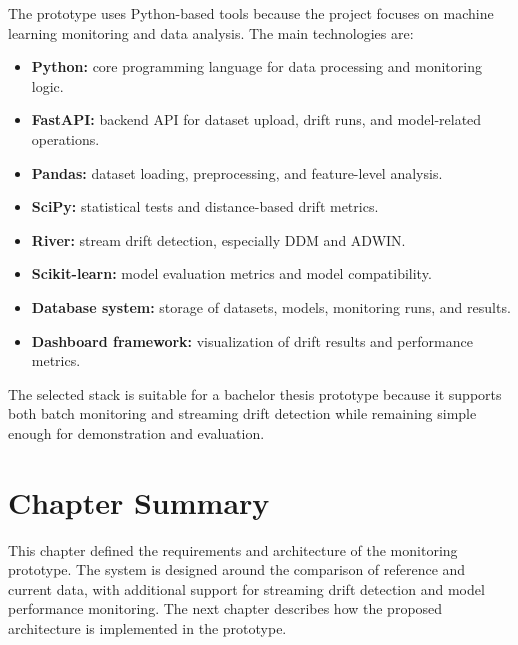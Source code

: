 The prototype uses Python-based tools because the project focuses on machine learning monitoring and data analysis. The main technologies are:

\begin{itemize}
    \item \textbf{Python:} core programming language for data processing and monitoring logic.
    \item \textbf{FastAPI:} backend API for dataset upload, drift runs, and model-related operations.
    \item \textbf{Pandas:} dataset loading, preprocessing, and feature-level analysis.
    \item \textbf{SciPy:} statistical tests and distance-based drift metrics.
    \item \textbf{River:} stream drift detection, especially DDM and ADWIN.
    \item \textbf{Scikit-learn:} model evaluation metrics and model compatibility.
    \item \textbf{Database system:} storage of datasets, models, monitoring runs, and results.
    \item \textbf{Dashboard framework:} visualization of drift results and performance metrics.
\end{itemize}

The selected stack is suitable for a bachelor thesis prototype because it supports both batch monitoring and streaming drift detection while remaining simple enough for demonstration and evaluation.

\section{Chapter Summary}

This chapter defined the requirements and architecture of the monitoring prototype. The system is designed around the comparison of reference and current data, with additional support for streaming drift detection and model performance monitoring. The next chapter describes how the proposed architecture is implemented in the prototype.